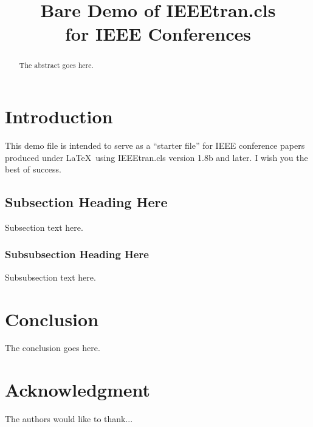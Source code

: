 \documentclass[conference,onecolumn]{IEEEtran}
\begin{document}
\title{Bare Demo of IEEEtran.cls\\ for IEEE Conferences}

\author{
\and
{}
\and
{}
}


\maketitle

\begin{abstract}
The abstract goes here.
\end{abstract}

\section{Introduction}
This demo file is intended to serve as a ``starter file''
for IEEE conference papers produced under \LaTeX\ using
IEEEtran.cls version 1.8b and later.
I wish you the best of success.

\subsection{Subsection Heading Here}
Subsection text here.

\subsubsection{Subsubsection Heading Here}
Subsubsection text here.

\section{Conclusion}
The conclusion goes here.


\section*{Acknowledgment}
The authors would like to thank...




\end{document}
